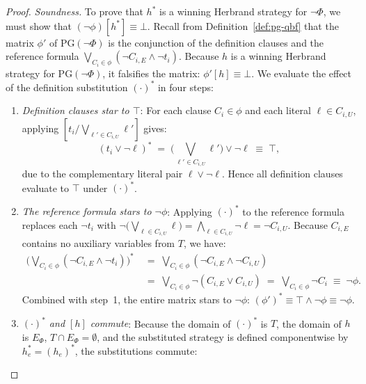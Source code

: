 \documentclass[runningheads]{llncs}
\newcommand{\PG}{\mathrm{PG}}
\begin{document}
\begin{proof}
    \emph{Soundness.}
    To prove that $h^*$ is a winning Herbrand strategy for $\neg\Phi$, we must show that $(\neg\phi)[h^*] \equiv \bot$.
    Recall from Definition~\ref{def:pg-qbf} that the matrix $\phi'$ of $\PG(\neg\Phi)$ is the conjunction of the definition clauses and the reference formula $\bigvee_{C_i \in \phi} (\neg C_{i,E} \land \neg t_i)$.
    Because $h$ is a winning Herbrand strategy for $\PG(\neg\Phi)$, it falsifies the matrix: $\phi'[h] \equiv \bot$.
    We evaluate the effect of the definition substitution $(\cdot)^*$ in four steps:
    \begin{enumerate}
        \item \emph{Definition clauses star to $\top$}:
              For each clause $C_i \in \phi$ and each literal $\ell \in C_{i,U}$, applying $[t_i / \bigvee_{\ell' \in C_{i,U}} \ell']$ gives:
              \begin{equation*}
                  (t_i \lor \neg\ell)^* \;=\; \Big(\bigvee_{\ell' \in C_{i,U}} \ell'\Big) \lor \neg\ell \;\equiv\; \top ,
              \end{equation*}
              due to the complementary literal pair $\ell \lor \neg\ell$.
              Hence all definition clauses evaluate to $\top$ under $(\cdot)^*$.
        \item \emph{The reference formula stars to $\neg\phi$}:
              Applying $(\cdot)^*$ to the reference formula replaces each $\neg t_i$ with $\neg\big(\bigvee_{\ell \in C_{i,U}} \ell\big) = \bigwedge_{\ell \in C_{i,U}} \neg\ell = \neg C_{i,U}$.
              Because $C_{i,E}$ contains no auxiliary variables from $T$, we have:
              \begin{align*}
                  \Big(\bigvee_{C_i \in \phi} (\neg C_{i,E} \land \neg t_i)\Big)^*
                   & \;=\; \bigvee_{C_i \in \phi} (\neg C_{i,E} \land \neg C_{i,U}) \\
                   & \;=\; \bigvee_{C_i \in \phi} \neg (C_{i,E} \lor C_{i,U})
                  \;=\; \bigvee_{C_i \in \phi} \neg C_i \;\equiv\; \neg\phi .
              \end{align*}
              Combined with step~1, the entire matrix stars to $\neg\phi$: $(\phi')^* \equiv \top \land \neg\phi \equiv \neg\phi$.
        \item \emph{$(\cdot)^*$ and $[h]$ commute}:
              Because the domain of $(\cdot)^*$ is $T$, the domain of $h$ is $E_\Phi$, $T \cap E_\Phi = \emptyset$, and the substituted strategy is defined componentwise by $h_e^* = (h_e)^*$, the substitutions commute:

\end{enumerate}
\end{proof}
\end{document}
